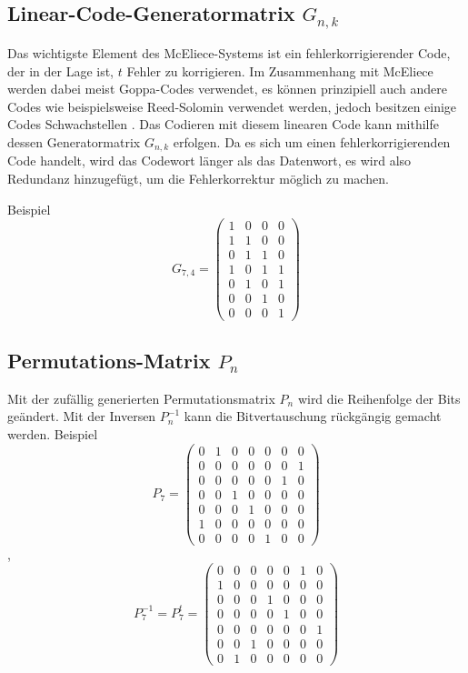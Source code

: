 \subsection{Linear-Code-Generatormatrix $G_{n,k}$
\label{mceliece:subsection:g_m}}
Das wichtigste Element des McEliece-Systems ist ein fehlerkorrigierender Code,
der in der Lage ist, $t$ Fehler zu korrigieren.
Im Zusammenhang mit McEliece werden dabei meist Goppa-Codes verwendet,
es können prinzipiell auch andere Codes wie beispielsweise Reed-Solomin verwendet werden,
jedoch besitzen einige Codes Schwachstellen \cite{mceliece:lorenz}.
Das Codieren mit diesem linearen Code kann mithilfe dessen Generatormatrix $G_{n,k}$ erfolgen.
Da es sich um einen fehlerkorrigierenden Code handelt,
wird das Codewort länger als das Datenwort,
es wird also Redundanz hinzugefügt,
um die Fehlerkorrektur möglich zu machen.

Beispiel
\[
    G_{7,4}=
    \begin{pmatrix}
        1 & 0 & 0 & 0\\
        1 & 1 & 0 & 0\\
        0 & 1 & 1 & 0\\
        1 & 0 & 1 & 1\\
        0 & 1 & 0 & 1\\
        0 & 0 & 1 & 0\\
        0 & 0 & 0 & 1
    \end{pmatrix}
\]

\subsection{Permutations-Matrix $P_n$
\label{mceliece:subsection:p_m}}
Mit der zufällig generierten Permutationsmatrix $P_n$ wird die Reihenfolge der Bits geändert.
Mit der Inversen $P_n^{-1}$ kann die Bitvertauschung rückgängig gemacht werden.
Beispiel
\[
    P_7=
    \begin{pmatrix}
        0 & 1 & 0 & 0 & 0 & 0 & 0\\
        0 & 0 & 0 & 0 & 0 & 0 & 1\\
        0 & 0 & 0 & 0 & 0 & 1 & 0\\
        0 & 0 & 1 & 0 & 0 & 0 & 0\\
        0 & 0 & 0 & 1 & 0 & 0 & 0\\
        1 & 0 & 0 & 0 & 0 & 0 & 0\\
        0 & 0 & 0 & 0 & 1 & 0 & 0
    \end{pmatrix}
\]
,
\[
    P_7^{-1}=P_7^t=
    \begin{pmatrix}
        0 & 0 & 0 & 0 & 0 & 1 & 0\\
        1 & 0 & 0 & 0 & 0 & 0 & 0\\
        0 & 0 & 0 & 1 & 0 & 0 & 0\\
        0 & 0 & 0 & 0 & 1 & 0 & 0\\
        0 & 0 & 0 & 0 & 0 & 0 & 1\\
        0 & 0 & 1 & 0 & 0 & 0 & 0\\
        0 & 1 & 0 & 0 & 0 & 0 & 0
    \end{pmatrix}
\]

